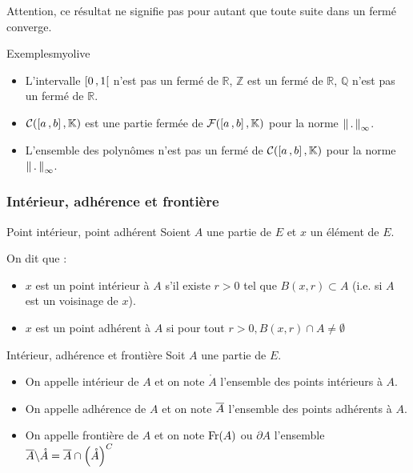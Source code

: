     Attention, ce résultat ne signifie pas pour autant que toute suite dans un fermé converge.

    \begin{omed}{Exemples}{myolive}
        \begin{itemize}
            \item L’intervalle $\left[ 0 \, , 1 \right[$ n’est pas un fermé de $\mathbb{R}$, $\mathbb{Z}$ est un fermé de $\mathbb{R}$, $\mathbb{Q}$ n’est pas un fermé de $\mathbb{R}$.
            \item $\mathcal{C}(\left[ a \, , b \right],\mathbb{K})$ est une partie fermée de $\mathcal{F}(\left[ a \, , b \right],\mathbb{K})$ pour la norme $\left\lVert\,.\,\right\rVert_{\infty}$.
            \item L’ensemble des polynômes n’est pas un fermé de $\mathcal{C}(\left[ a \, , b \right],\mathbb{K})$ pour la norme $\left\lVert\,.\,\right\rVert_{\infty}$.
        \end{itemize}
    \end{omed}

    \subsubsection{Intérieur, adhérence et frontière}

    \begin{defi}{Point intérieur, point adhérent}{}
        Soient $A$ une partie de $E$ et $x$ un élément de $E$.

        On dit que :
        \begin{itemize}
            \item $x$ est un point intérieur à $A$ s’il existe $r > 0$ tel que $B(x,r) \subset A$ (i.e. si $A$ est un voisinage de $x$).
            \item $x$ est un point adhérent à $A$ si pour tout $r > 0, B(x,r) \cap A \neq \emptyset$
        \end{itemize}
    \end{defi}

    \begin{defi}{Intérieur, adhérence et frontière}
        Soit $A$ une partie de $E$.
        \begin{itemize}
            \item On appelle intérieur de $A$ et on note $\mathring{A}$ l’ensemble des points intérieurs à $A$.
            \item On appelle adhérence de $A$ et on note $\overline{A}$ l’ensemble des points adhérents à $A$.
            \item On appelle frontière de $A$ et on note $\operatorname{Fr}(A)$ ou $\partial A$ l’ensemble $\overline{A} \backslash \mathring{A} = \overline{A} \cap \left(\mathring{A}\right)^C$
        \end{itemize}
    \end{defi}

